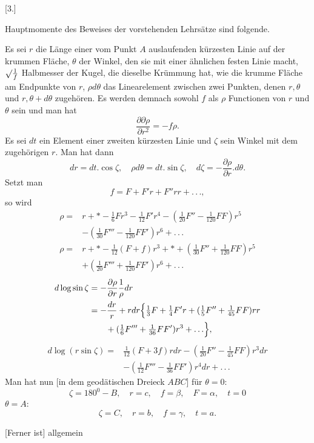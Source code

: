 \par{}\begin{center}[3.]\end{center}
\noindent\hspace*{1.2em}Hauptmomente des Beweises der vorstehenden Lehrsätze sind folgende.

Es sei $r$ die Länge einer vom Punkt $A$ auslaufenden kürzesten Linie auf der krummen Fläche, $\theta$ der Winkel, den sie mit einer ähnlichen festen Linie macht, $\mathord{\surd}\frac1f$ Halbmesser der Kugel, die dieselbe Krümmung hat, wie die krumme Fläche am Endpunkte von $r$, $\rho d\theta$ das Linearelement zwischen zwei Punkten, denen $r,\theta$ und $r,\theta+d\theta$ zugehören. Es werden demnach sowohl $f$ als $\rho$ Functionen von $r$ und $\theta$ sein und man hat
\[
\frac{\partial\partial\rho}{\partial r^2}=-f\rho.
\]
\indent Es sei $dt$ ein Element einer zweiten kürzesten Linie und $\zeta$ sein Winkel mit dem zugehörigen $r$. Man hat dann
\[
dr=dt.\cos\zeta,\quad\rho d\theta=dt.\sin\zeta,\quad d\zeta=-\frac{\partial\rho}{\partial r}.d\theta.
\]
\noindent Setzt man
\[
f=F+F'r+F''rr+.\, .\, .,
\]
\noindent so wird
\[
\begin{aligned}
\rho={}&r+*-\tfrac16Fr^3-\tfrac1{12}F'r^4-(\tfrac1{20}F''-\tfrac1{120}FF)r^5\\
&-(\tfrac1{30}F'''-\tfrac1{120}FF')r^6+.\, .\, .\\
\rho={}&r+*-\tfrac1{12}(F+f)r^3+*+(\tfrac1{30}F''+\tfrac1{120}FF)r^5\\
&+(\tfrac1{20}F'''+\tfrac1{120}FF')r^6+.\, .\, .
\end{aligned}
\]
\[
\begin{aligned}
d\log\sin\zeta&=-\frac{\partial\rho}{\partial r}\frac1\rho dr\\
&=-\frac{dr}r+rdr\Bigl\{\tfrac13F+\tfrac14F'r+(\tfrac15F''+\tfrac1{45}FF)rr\\
&\qquad+(\tfrac16F'''+\tfrac1{36}FF')r^3+.\, .\, .\Bigr\},
\end{aligned}
\]
\[
\begin{aligned}
d\log(r\sin\zeta)={}&\tfrac1{12}(F+3f)rdr-(\tfrac1{20}F''-\tfrac1{45}FF)r^3dr\\
&-(\tfrac1{12}F'''-\tfrac1{36}FF')r^4dr+.\, .\, .
\end{aligned}
\]
\indent Man hat nun [in dem geodätischen Dreieck $ABC$] für $\theta=0$:
\[
\zeta=180^0-B,\quad r=c,\quad f=\beta,\quad F=\alpha,\quad t=0
\]
 $\theta=A$:
\[
\zeta=C,\quad r=b,\quad f=\gamma,\quad t=a.
\]
\begin{center}\end{center}
\noindent\hspace*{1.2em}[Ferner ist] allgemein
